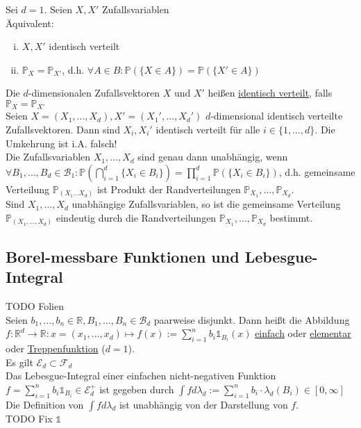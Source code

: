 \documentclass[a4paper]{article}
\newcommand{\ul}{\underline}
\begin{document}
Sei $d=1$. Seien $X,X'$ Zufallsvariablen\\
Äquivalent:
\begin{enumerate}[(i)]
	\item $X,X'$ identisch verteilt
	\item $\mathbb{P}_X=\mathbb{P}_{X'}$, d.h. $\forall A\in B:\mathbb{P}(\{X\in A\})=\mathbb{P}(\{X'\in A\})$
\end{enumerate}
Die $d$-dimensionalen Zufallsvektoren $X$ und $X'$ heißen \ul{identisch verteilt}, falls $\mathbb{P}_X=\mathbb{P}_{X'}$\\
Seien $X=(X_1,\dots,X_d),X'=(X_1',\dots,X_d')$ $d$-dimensional identisch verteilte Zufallsvektoren. Dann sind $X_i,X_i'$ identisch verteilt für alle $i\in\{1,\dots,d\}$. Die Umkehrung ist i.A. falsch!\\
Die Zufallsvariablen $X_1,\dots,X_d$ sind genau dann unabhängig, wenn $\forall B_1,\dots,B_d\in \mathcal{B}_1:\mathbb{P}(\bigcap_{i=1}^d\{X_i\in B_i\})=\prod_{i=1}^d\mathbb{P}(\{X_i\in B_i\})$, d.h. gemeinsame Verteilung $\mathbb{P}_{(X_1\dots X_d)}$ ist Produkt der Randverteilungen $\mathbb{P}_{X_1},\dots,\mathbb{P}_{X_d}$.\\
Sind $X_1,\dots,X_d$ unabhängige Zufallsvariablen, so ist die gemeinsame Verteilung $\mathbb{P}_{(X_1,\dots,X_d)}$ eindeutig durch die Randverteilungen $\mathbb{P}_{X_1},\dots,\mathbb{P}_{X_d}$ bestimmt.\\
\subsection{Borel-messbare Funktionen und Lebesgue-Integral}
TODO Folien\\
Seien $b_1,\dots,b_n\in\mathbb{R},B_1,\dots,B_n\in\mathcal{B}_d$ paarweise disjunkt. Dann heißt die Abbildung $f:\mathbb{R}^d\rightarrow\mathbb{R}:x=(x_1,\dots,x_d)\mapsto f(x):=\sum_{i=1}^n b_i\mathbb{1}_{B_i}(x)$ \ul{einfach} oder \ul{elementar} oder \ul{Treppenfunktion} ($d=1$).\\
Es gilt $\mathcal{E}_d\subset \mathcal{F}_d$\\
Das Lebesgue-Integral einer einfachen nicht-negativen Funktion $f=\sum_{i=1}^nb_i\mathbb{1}_{B_i}\in\mathcal{E}_d^+$ ist gegeben durch $\int fd\lambda_d:=\sum_{i=1}^nb_i\cdot\lambda_d(B_i)\in\left[0,\infty\right]$\\
Die Definition von $\int fd\lambda_d$ ist unabhängig von der Darstellung von $f$.\\


TODO Fix $\mathbb{1}$
\end{document}
